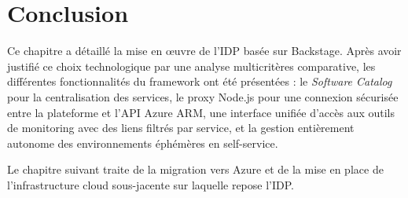 \section*{Conclusion}

Ce chapitre a détaillé la mise en œuvre de l'\ac{IDP} basée sur Backstage. Après avoir justifié ce choix technologique par une analyse multicritères comparative, les différentes fonctionnalités du framework ont été présentées : le \textit{Software Catalog} pour la centralisation des services, le proxy Node.js pour une connexion sécurisée entre la plateforme et l'\ac{API} Azure ARM, une interface unifiée d'accès aux outils de monitoring avec des liens filtrés par service, et la gestion entièrement autonome des environnements éphémères en self-service.

Le chapitre suivant traite de la migration vers Azure et de la mise en place de l'infrastructure cloud sous-jacente sur laquelle repose l'\ac{IDP}.